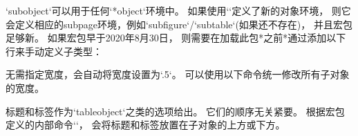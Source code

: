 `subobject`可以用于任何`*object`环境中。 
如果使用`\NewObjectStyle`定义了新的对象环境，
则它会定义相应的subpage环境，例如`subfigure`\slash{}`subtable`(如果还不存在)，
并且宏包足够新。 
如果宏包早于2020年8月30日，
则需要在加载此包*之前*通过添加以下行来手动定义子类型\autocite{texexchange_subtype_workaround}：
\begin{examplecode\starred}{}
\end{examplecode\starred}

无需指定宽度，会自动将宽度设置为`.5\linewidth`。
可以使用以下命令统一修改所有子对象的宽度。
\begin{examplecode\starred}{}
\end{examplecode\starred}

标题和标签作为`tableobject`之类的选项给出。
它们的顺序无关紧要。 
根据宏包定义的内部命令`\caption@iftop`，
会将标题和标签放置在子对象的上方或下方。

